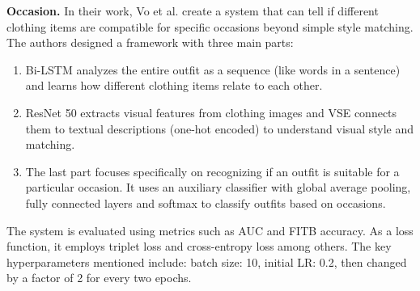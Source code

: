 \textbf{Occasion.}
In their work, Vo et al. create a system that can tell if different clothing items are compatible for specific occasions beyond simple style matching. The authors designed a framework with three main parts: \cite[vgl.]{vo_efficient_2023}
\begin{enumerate}
  \item \acs{Bi-LSTM} analyzes the entire outfit as a sequence (like words in a sentence) and learns how different clothing items relate to each other.
  \item \acs{ResNet} 50 extracts visual features from clothing images and \acs{VSE} connects them to textual descriptions (one-hot encoded) to understand visual style and matching.
  \item The last part focuses specifically on recognizing if an outfit is suitable for a particular occasion. It uses an auxiliary classifier with global average pooling, fully connected layers and softmax to classify outfits based on occasions.
\end{enumerate}
The system is evaluated using metrics such as \acs{AUC} and \acs{FITB} accuracy. As a loss function, it employs triplet loss and cross-entropy loss among others. The key hyperparameters mentioned include: batch size: 10, initial \acs{LR}: 0.2, then changed by a factor of 2 for every two epochs. \cite[vgl.]{vo_efficient_2023}
